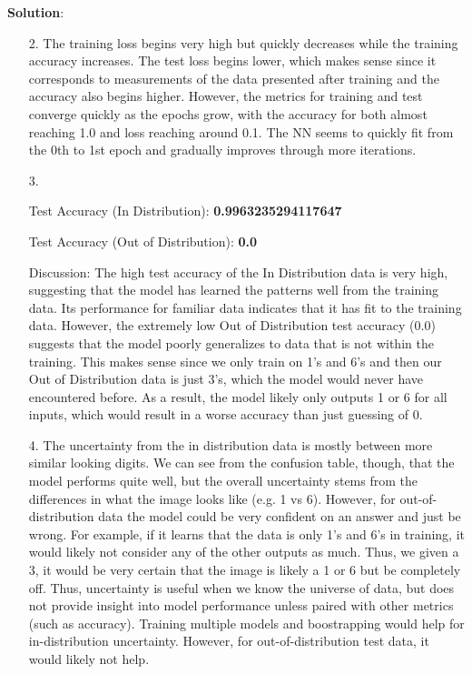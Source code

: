 \documentclass[submit]{../harvardml}
\newenvironment{answer}{
    \vspace{2mm}
    \color{blue}\noindent\textbf{Solution}:
}{}
\begin{document}
\begin{answer}
\begin{enumerate}
\begin{lstlisting}[language=Python]
\end{lstlisting}

    \item[2.]
    The training loss begins very high but quickly decreases while the training accuracy increases. The test loss begins lower, which makes sense since it corresponds to measurements of the data presented after training and the accuracy also begins higher. However, the metrics for training and test converge quickly as the epochs grow, with the accuracy for both almost reaching 1.0 and loss reaching around 0.1. The NN seems to quickly fit from the 0th to 1st epoch and gradually improves through more iterations.

    \item[3.]

      Test Accuracy (In Distribution): \textbf{0.9963235294117647}

      Test Accuracy (Out of Distribution): \textbf{0.0}

      Discussion: The high test accuracy of the In Distribution data is very high, suggesting that the model has learned the patterns well from the training data. Its performance for familiar data indicates that it has fit to the training data. However, the extremely low Out of Distribution test accuracy (0.0) suggests that the model poorly generalizes to data that is not within the training. This makes sense since we only train on 1's and 6's and then our Out of Distribution data is just 3's, which the model would never have encountered before. As a result, the model likely only outputs 1 or 6 for all inputs, which would result in a worse accuracy than just guessing of 0.
      

    \item[4.]
    The uncertainty from the in distribution data is mostly between more similar looking digits. We can see from the confusion table, though, that the model performs quite well, but the overall uncertainty stems from the differences in what the image looks like (e.g. 1 vs 6). However, for out-of-distribution data the model could be very confident on an answer and just be wrong. For example, if it learns that the data is only 1's and 6's in training, it would likely not consider any of the other outputs as much. Thus, we given a 3, it would be very certain that the image is likely a 1 or 6 but be completely off. Thus, uncertainty is useful when we know the universe of data, but does not provide insight into model performance unless paired with other metrics (such as accuracy). Training multiple models and boostrapping would help for in-distribution uncertainty. However, for out-of-distribution test data, it would likely not help.
    


\end{enumerate}
\end{answer}
\end{document}
